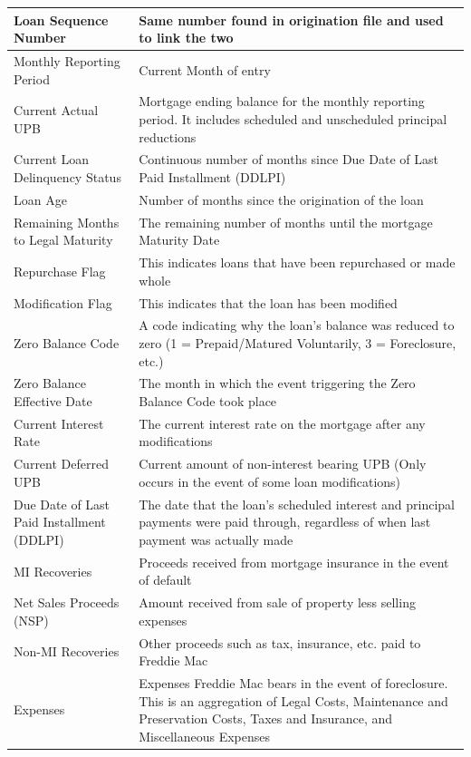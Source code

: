 \documentclass[12 pt]{uncw_thesis}
\theoremstyle{plain}
\theoremstyle{remark}
\theoremstyle{definition}
\begin{document}
\begin{center}
	\begin{longtable}{ |M{6cm}|M{8cm}| } 
		\hline
		Loan Sequence Number &  Same number found in origination file and used to link the two\\
		\hline
		Monthly Reporting Period & Current Month of entry\\ 
		\hline
		Current Actual UPB & Mortgage ending balance for the  monthly reporting period. It includes scheduled and unscheduled principal reductions\\
		\hline
		Current Loan Delinquency Status& Continuous number of months since Due Date of Last Paid Installment (DDLPI)\\
		\hline
		Loan Age & Number of months since the origination of the loan \\ 
		\hline
		Remaining Months to Legal Maturity & The remaining number of months until the mortgage Maturity Date\\
		\hline
		Repurchase Flag & This indicates loans that have been repurchased or made whole\\
		\hline
		Modification Flag & This indicates that the loan has been modified\\
		\hline
		Zero Balance Code & A code indicating why the loan's balance was reduced to zero (1 = Prepaid/Matured Voluntarily, 3 = Foreclosure, etc.)\\
		\hline
		Zero Balance Effective Date & The month in which the event triggering the Zero Balance Code took place \\
		\hline
		Current Interest Rate & The current interest rate on the mortgage after any modifications\\
		\hline
		Current Deferred UPB & Current amount of non-interest bearing UPB (Only occurs in the event of some loan modifications)\\
		\hline
		Due Date of Last Paid Installment (DDLPI)&The date that the loan's scheduled interest and principal payments were paid through, regardless of when last payment was actually made\\
		\hline
		MI Recoveries & Proceeds received from mortgage insurance in the event of default\\
		\hline
		Net Sales Proceeds (NSP)& Amount received from sale of property less selling expenses\\
		\hline
		Non-MI Recoveries& Other proceeds such as tax, insurance, etc. paid to Freddie Mac\\
		\hline
		Expenses & Expenses Freddie Mac bears in the event of foreclosure. This is an aggregation of Legal Costs, Maintenance and Preservation Costs, Taxes and Insurance, and Miscellaneous Expenses\\

\end{longtable}
\end{center}
\end{document}
